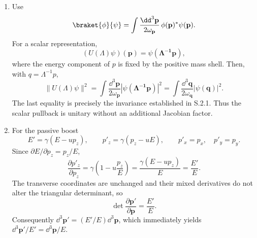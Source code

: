 \begin{enumerate}
\begin{enumerate}
The common covariant convention is
\[
 \braket{p',\sigma'}{p,\sigma}_{\rm cov}
 =2\omega_{\mathbf p}(2\pi)^3
 \delta_{\sigma'\sigma}\delta^3(\mathbf p-\mathbf p').
\]
The convention of Eq.~\eqref{eq:2.5.19} omits the factor
\(2\omega_{\mathbf p}(2\pi)^3\).  The compensating factor
\(\sqrt{(\Lambda p)^0/p^0}\) then appears in the state transformation law.
\item
Use
\[
 \braket{\phi}{\psi}
 =\int\frac{\dd^3\mathbf p}{2\omega_{\mathbf p}}\,
   \phi(\mathbf p)^*\psi(\mathbf p).
\]
For a scalar representation,
\[
 (U(\Lambda)\psi)(\mathbf p)
 =\psi(\boldsymbol{\Lambda^{-1}p}),
\]
where the energy component of \(p\) is fixed by the positive mass shell.
Then, with \(q=\Lambda^{-1}p\),
\[
 \|U(\Lambda)\psi\|^2
 =\int\frac{\dd^3\mathbf p}{2\omega_{\mathbf p}}
   |\psi(\boldsymbol{\Lambda^{-1}p})|^2
 =\int\frac{\dd^3\mathbf q}{2\omega_{\mathbf q}}|\psi(\mathbf q)|^2.
\]
The last equality is precisely the invariance established in S.2.1.
Thus the scalar pullback is unitary without an additional Jacobian factor.
\item
For the passive boost
\[
 E'=\gamma(E-up_z),\qquad
 p'_z=\gamma(p_z-uE),\qquad p'_x=p_x,\quad p'_y=p_y.
\]
Since \(\partial E/\partial p_z=p_z/E\),
\[
 \frac{\partial p'_z}{\partial p_z}
 =\gamma\left(1-u\frac{p_z}{E}\right)
 =\frac{\gamma(E-up_z)}{E}=\frac{E'}{E}.
\]
The transverse coordinates are unchanged and their mixed derivatives do
not alter the triangular determinant, so
\[
 \det\frac{\partial\mathbf p'}{\partial\mathbf p}
 =\frac{E'}{E}.
\]
Consequently \(\dd^3\mathbf p'=(E'/E)\dd^3\mathbf p\), which immediately yields
\(\dd^3\mathbf p'/E'=\dd^3\mathbf p/E\).
\end{enumerate}


\end{enumerate}
